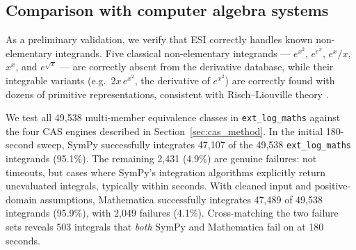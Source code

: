 \documentclass[preprint,12pt,authoryear]{elsarticle}
\newcommand{\hd}[1]{{\color{red}\textbf{[HD: #1]}}}
\begin{document}
\subsection{Comparison with computer algebra systems}
\label{sec:cas}

As a preliminary validation, we verify that ESI correctly handles known non-elementary integrands. Five classical non-elementary integrands \citep[see e.g.][]{Bronstein2005} --- $e^{x^2}$, $e^{e^x}$, $e^x / x$, $x^x$, and $e^{\sqrt{x}}$ --- are correctly absent from the derivative database, while their integrable variants (e.g.\ $2x\,e^{x^2}$, the derivative of $e^{x^2}$) are correctly found with dozens of primitive representations, consistent with Risch--Liouville theory \citep{Risch1969,Bronstein2005}.

We test all 49{,}538 multi-member equivalence classes in \texttt{ext\_log\_maths} against the four CAS engines described in Section~\ref{sec:cas_method}. In the initial 180-second sweep, SymPy successfully integrates 47{,}107 of the 49{,}538 \texttt{ext\_log\_maths} integrands (95.1\%). The remaining 2{,}431 (4.9\%) are genuine failures: not timeouts, but cases where SymPy's integration algorithms explicitly return unevaluated integrals, typically within seconds.
With cleaned input and positive-domain assumptions, Mathematica successfully integrates 47{,}489 of 49{,}538 integrands (95.9\%), with 2{,}049 failures (4.1\%). Cross-matching the two failure sets reveals 503 integrals that \emph{both} SymPy and Mathematica fail on at 180 seconds.
\end{document}
